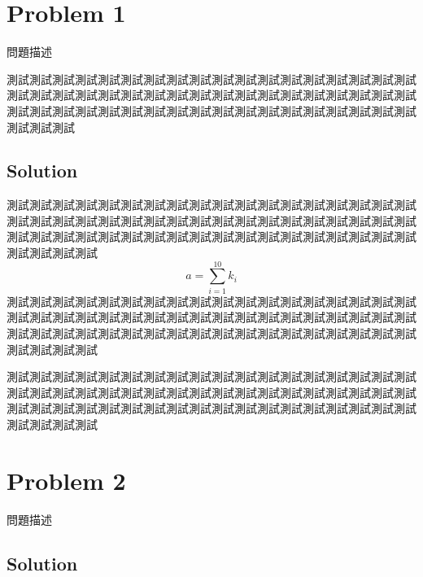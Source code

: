 \documentclass[12pt]{article}
\begin{document}
\begin{CJK}{UTF8}{bkai}

\cfoot{\thepage}

\tableofcontents\thispagestyle{fancy}


\section{Problem 1}

問題描述

測試測試測試測試測試測試測試測試測試測試測試測試測試測試測試測試測試測試測試測試測試測試測試測試測試測試測試測試測試測試測試測試測試測試測試測試測試測試測試測試測試測試測試測試測試測試測試測試測試測試測試測試測試測試測試測試測試

\subsection*{Solution}

測試測試測試測試測試測試測試測試測試測試測試測試測試測試測試測試測試測試測試測試測試測試測試測試測試測試測試測試測試測試測試測試測試測試測試測試測試測試測試測試測試測試測試測試測試測試測試測試測試測試測試測試測試測試測試測試測試測試
\begin{equation*}
    a = \sum_{i=1}^{10} k_i
\end{equation*}
測試測試測試測試測試測試測試測試測試測試測試測試測試測試測試測試測試測試測試測試測試測試測試測試測試測試測試測試測試測試測試測試測試測試測試測試測試測試測試測試測試測試測試測試測試測試測試測試測試測試測試測試測試測試測試測試測試測試

測試測試測試測試測試測試測試測試測試測試測試測試測試測試測試測試測試測試測試測試測試測試測試測試測試測試測試測試測試測試測試測試測試測試測試測試測試測試測試測試測試測試測試測試測試測試測試測試測試測試測試測試測試測試測試測試測試測試

\clearpage
\section{Problem 2}

問題描述

\subsection*{Solution}


\end{CJK}
\end{document}
